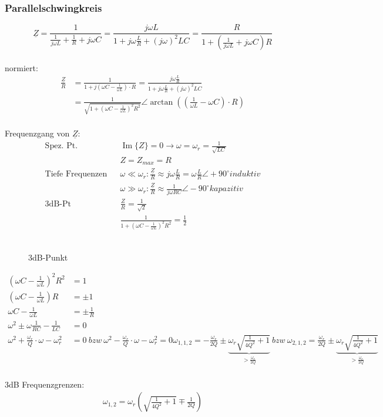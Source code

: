   
\subsubsection{Parallelschwingkreis}
$$\underline{Z} = \frac{1}{\frac{1}{j\omega L}+\frac{1}{R} + j \omega C}
= \frac{j\omega L}{1+j\omega \frac{L}{R}+(j\omega)^2LC}
= \frac{R}{1+(\frac{1}{j\omega L}+j\omega C)R}$$\\
normiert:\\
\begin{align}
\frac{\underline{Z}}{R}&=\frac{1}{1+j(\omega C-\frac{1}{\omega L})\cdot R}
=\frac{j\omega \frac{L}{R}}{1+j\omega\frac{L}{R}+(j\omega)^2LC}\nonumber\\
&=\frac{1}{\sqrt{1+(\omega C - \frac{1}{\omega
L})^2R^2}} \angle \arctan{((\frac{1}{\omega L}-\omega C)\cdot R)} \nonumber
\end{align}\\

Frequenzgang von $\underline Z$:\\
\begin{align}
	\text{Spez. Pt.}&&
	\operatorname{Im}{\{Z\}} = 0 \rightarrow \omega =
	\omega_r=\frac{1}{\sqrt{LC}}\nonumber\\ && Z = Z_{max} = R\nonumber\\
	\text{Tiefe Frequenzen} &&
	\omega \ll \omega_r: \frac{\underline Z}{R} \approx
	j\omega\frac{L}{R}=\omega\frac{L}{R} \angle +90^\circ induktiv\nonumber\\ && \omega \gg \omega_r: \frac{\underline Z}{R} \approx \frac{1}{j\omega RC}
	\angle -90^\circ kapazitiv\nonumber\\
	\text{3dB-Pt} &&
	\frac{Z}{R}=\frac{1}{\sqrt{2}}\nonumber\\
	&& \frac{1}{1+(\omega C-\frac{1}{\omega L})^2R^2}=\frac{1}{2}\nonumber
\end{align}\\

\begin{wrapfigure}{l}{0.5\textwidth}
	\centering
	
	\caption{3dB-Punkt}
	\label{fig:3dBPunkt}
\end{wrapfigure}
\begin{align}
	(\omega C-\frac{1}{\omega L})^2R^2 &= 1\nonumber\\
	(\omega C - \frac{1}{\omega L})R &= \pm 1\nonumber\\
	\omega C - \frac{1}{\omega L} &= \pm \frac{1}{R}\nonumber\\
	\omega^2 \pm \omega \frac{1}{RC}-\frac{1}{LC} &= 0\nonumber\\
	\omega^2 + \frac{\omega_r}{Q}\cdot \omega - \omega_r^2&=0\ bzw\ \omega^2 -
	\frac{\omega_r}{Q}\cdot \omega - \omega_r^2=0\nonumber
	\omega_{1,1,2} = -\frac{\omega_r}{2Q} \pm 
	\underbrace{\omega_r\sqrt{\frac{1}{4Q^2}+1}}_{>\frac{\omega_r}{2Q}}
	\	bzw\ \omega_{2,1,2}=\frac{\omega_r}{2Q} \pm
	\underbrace{\omega_r\sqrt{\frac{1}{4Q^2}+1}}_{>\frac{\omega_r}{2Q}} \nonumber\\
\end{align}


3dB Frequenzgrenzen:\\
\begin{align}
\boxed{\omega_{1,2}=\omega_r(\sqrt{\frac{1}{4Q^2}+1}\mp\frac{1}{2Q})}
\end{align}
